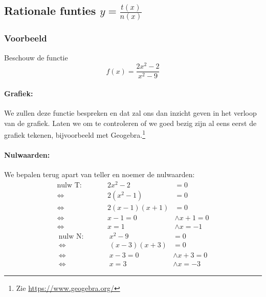 \documentclass[12pt,twoside,a4paper]{article}
\begin{document}
\subsection{Rationale funties $y=\frac{t(x)}{n(x)}$}

\subsubsection*{Voorbeeld}
Beschouw de functie
$$f(x)=\dfrac{2x^2-2}{x^2-9}$$

\begin{center}
\end{center}

\paragraph{Grafiek: }
We zullen deze functie bespreken en dat zal ons dan inzicht geven in het verloop van de grafiek. Laten we om te controleren of we goed bezig zijn al eens eerst de grafiek tekenen, bijvoorbeeld met Geogebra.\footnote{Zie \url{https://www.geogebra.org/}}

\paragraph{Nulwaarden: }
We bepalen terug apart van teller en noemer de nulwaarden:
\begin{align*}
  \text{nulw T:}\qquad && 2x^2-2      &= 0\\
  \Leftrightarrow               && 2(x^2 -1)   &= 0\\
  \Leftrightarrow               && 2(x-1)(x+1) &= 0\\
  \Leftrightarrow               && x-1 = 0 &\wedge x+1 = 0\\
  \Leftrightarrow               && x = 1   &\wedge x = -1
\end{align*}
\begin{align*}
  \text{nulw N:}\qquad && x^2-9      &= 0\\
  \Leftrightarrow               && (x-3)(x+3) &= 0\\
  \Leftrightarrow               && x-3 = 0 &\wedge x+3 = 0\\
  \Leftrightarrow               && x = 3   &\wedge x = -3
\end{align*}
\end{document}
